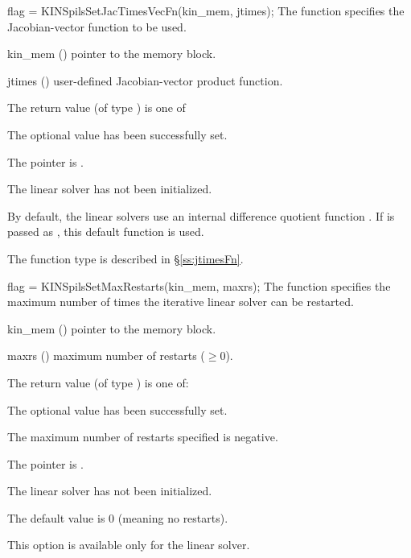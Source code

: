 {
  flag = KINSpilsSetJacTimesVecFn(kin\_mem, jtimes);
}
{
  The function  specifies the Jacobian-vector 
  function to be used.
}
{
  \begin{args}
  \item[kin\_mem] ()
    pointer to the {\kinsol} memory block.
  \item[jtimes] ()
    user-defined Jacobian-vector product function.
  \end{args}
}
{
  The return value  (of type ) is one of
  \begin{args}
  \item[\Id{KINSPILS\_SUCCESS}] 
    The optional value has been successfully set.
  \item[\Id{KINSPILS\_MEM\_NULL}]
    The  pointer is .
  \item[\Id{KINSPILS\_LMEM\_NULL}]
    The {\kinspils} linear solver has not been initialized.
  \end{args}
}
{
  By default, the {\kinspils} linear solvers use an internal difference quotient 
  function .
  If  is passed as , this default function is used.

  The function type  is described in \S\ref{ss:jtimesFn}.
}
{
  flag = KINSpilsSetMaxRestarts(kin\_mem, maxrs);
}
{
  The function  specifies the maximum
  number of times the iterative linear solver can be restarted.
}
{
  \begin{args}
  \item[kin\_mem] ()
    pointer to the {\kinsol} memory block.
  \item[maxrs] ()
    maximum number of restarts ($\geq 0$).
  \end{args}
}
{
  The return value  (of type ) is one of:
  \begin{args}
  \item[\Id{KINSPILS\_SUCCESS}] 
    The optional value has been successfully set.
  \item[\Id{KINSPILS\_ILL\_INPUT}]
    The maximum number of restarts specified is negative.
  \item[\Id{KINSPILS\_MEM\_NULL}]
    The  pointer is .
  \item[\Id{KINSPILS\_LMEM\_NULL}]
    The linear solver has not been initialized.
  \end{args}
}
{
  The default value is $0$ (meaning no restarts).

  {\warn}This option is available only for the {\kinspgmr} linear solver.
}

